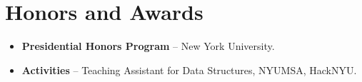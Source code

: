 \documentclass[11pt,a4paper,sans]{moderncv}
\begin{document}

\section{Honors and Awards}
\vspace{1pt}
\begin{itemize}
\item{\textbf{Presidential Honors Program} -- New York University.}
\item{\textbf{Activities} -- Teaching Assistant for Data Structures, NYUMSA, HackNYU.}
\end{itemize}

\end{document}
